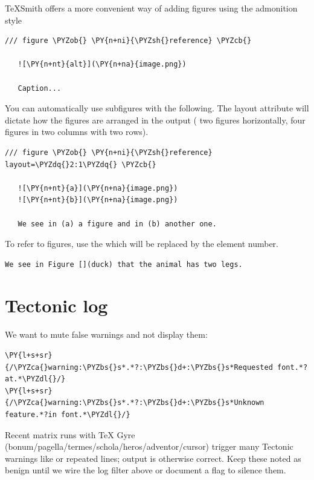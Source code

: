 \documentclass[a4paper,twoside]{article}
\begin{document}
TeXSmith offers a more convenient way of adding figures using the admonition style
\begin{tscode}[lang=md, engine=pygments]
\begin{Verbatim}[commandchars=\\\{\},breaklines, breakanywhere, commandchars=\\\{\}]
/// figure \PYZob{} \PY{n+ni}{\PYZsh{}reference} \PYZcb{}

   ![\PY{n+nt}{alt}](\PY{n+na}{image.png})

   Caption...
\end{Verbatim}
\end{tscode}
You can automatically use subfigures with the following. The layout attribute will dictate how the figures are arranged in the output ( two figures horizontally,  four figures in two columns with two rows).
\begin{tscode}[lang=md, engine=pygments]
\begin{Verbatim}[commandchars=\\\{\},breaklines, breakanywhere, commandchars=\\\{\}]
/// figure \PYZob{} \PY{n+ni}{\PYZsh{}reference} layout=\PYZdq{}2:1\PYZdq{} \PYZcb{}

   ![\PY{n+nt}{a}](\PY{n+na}{image.png})
   ![\PY{n+nt}{b}](\PY{n+na}{image.png})

   We see in (a) a figure and in (b) another one.
\end{Verbatim}
\end{tscode}
To refer to figures, use the  which will be replaced by the element number.
\begin{tscode}[lang=markdown, engine=pygments]
\begin{Verbatim}[commandchars=\\\{\},breaklines, breakanywhere, commandchars=\\\{\}]
We see in Figure [](duck) that the animal has two legs.
\end{Verbatim}
\end{tscode}
\section{Tectonic log}
We want to mute false warnings and not display them:
\begin{tscode}[lang=perl, engine=pygments]
\begin{Verbatim}[commandchars=\\\{\},breaklines, breakanywhere, commandchars=\\\{\}]
\PY{l+s+sr}{/\PYZca{}warning:\PYZbs{}s*.*?:\PYZbs{}d+:\PYZbs{}s*Requested font.*?at.*\PYZdl{}/}
\PY{l+s+sr}{/\PYZca{}warning:\PYZbs{}s*.*?:\PYZbs{}d+:\PYZbs{}s*Unknown feature.*?in font.*\PYZdl{}/}
\end{Verbatim}
\end{tscode}
Recent matrix runs with \TeX{} Gyre (bonum/pagella/termes/schola/heros/adventor/cursor) trigger
many Tectonic warnings like  or repeated  lines; output is
otherwise correct. Keep these noted as benign until we wire the log filter above or document a
flag to silence them.
\end{document}
